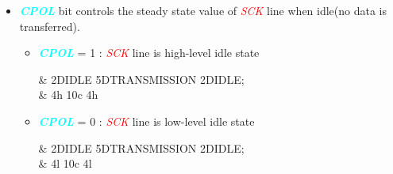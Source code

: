 \documentclass{article}
\newcommand{\bitFormat}[1]{\emph{\textbf{\textcolor{cyan}{#1}}}}
\newcommand{\pinFormat}[1]{\emph{\textcolor{red}{#1}}}
\begin{document}
\begin{itemize}
	\item \bitFormat{CPOL} bit controls the steady state value of \pinFormat{SCK} line when idle(no data is transferred).
	\begin{itemize}
		\item \bitFormat{CPOL} = 1 : \pinFormat{SCK} line is high-level idle state
		\begin{center}
			\begin{tikztimingtable}[%
				timing/dslope=0.1,
				timing/.style={x=5ex,y=2ex},
				x=5ex,
				timing/rowdist=3ex,
				timing/name/.style={font=\sffamily\scriptsize}
				]
				 & 2D{IDLE} 5D{TRANSMISSION} 2D{IDLE};\\
				         & 4{h} 10{c} 4{h}\\				
			\end{tikztimingtable}
		\end{center}
			
		\item \bitFormat{CPOL}  = 0 : \pinFormat{SCK} line is low-level idle state
		\begin{center}
			\begin{tikztimingtable}[%
				timing/dslope=0.1,
				timing/.style={x=5ex,y=2ex},
				x=5ex,
				timing/rowdist=3ex,
				timing/name/.style={font=\sffamily\scriptsize}
				]
				 & 2D{IDLE} 5D{TRANSMISSION} 2D{IDLE};\\
				         & 4{l} 10{c} 4{l}\\				
			\end{tikztimingtable}
		\end{center}
	\end{itemize}


\end{itemize}
\end{document}
